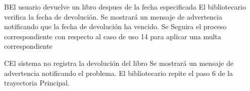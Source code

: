 		\begin{UCtrayectoriaA}{B}{El usuario devuelve un libro despues de la fecha especificada}
			\UCpaso[\UCactor] El bibliotecario verifica la fecha de devolución.
			\UCpaso[\UCsist] Se mostrará un mensaje de advertencia notificando que la fecha de devolución ha vencido. 
			\UCpaso[\UCsist] Se Seguira el proceso correspondiente con respecto al caso de uso 14  para aplicar una multa correspondiente
		\end{UCtrayectoriaA}


		\begin{UCtrayectoriaA}{C}{El sistema no registra la devolución del libro}
			\UCpaso[\UCsist] Se mostrará un mensaje de advertencia notificando el problema. 
			\UCpaso[\UCactor]El bibliotecario repite el paso 6 de la trayectoria Principal.
		\end{UCtrayectoriaA}
